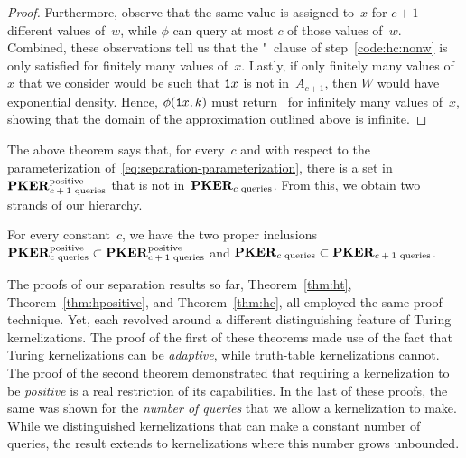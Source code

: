 \begin{proof}
  Furthermore, observe that the same value is assigned to~$x$ for $c + 1$ different values of~$w$, while $\phi$ can query at most $c$ of those values of~$w$.
  Combined, these observations tell us that the "~clause of step~\ref{code:hc:nonw} is only satisfied for finitely many values of~$x$.
  Lastly, if only finitely many values of~$x$ that we consider would be such that $\textnormal{\texttt{1}}x$ is not in~$A_{c + 1}$, then $W$ would have exponential density.
  Hence, $\phi(\textnormal{\texttt{1}}x, k)$ must return~ for infinitely many values of~$x$, showing that the domain of the approximation outlined above is infinite.
\end{proof}

The above theorem says that, for every~$c$ and with respect to the parameterization of~\eqref{eq:separation-parameterization}, there is a set in $\textnormal{\textbf{PKER}}^\textnormal{positive}_\textnormal{$c + 1$ queries}$ that is not in~$\textnormal{\textbf{PKER}}_\textnormal{$c$ queries}$.
From this, we obtain two strands of our hierarchy.
\begin{corollary}
\label{cor:hc}%
  For every constant~$c$, we have the two proper inclusions $\textnormal{\textbf{PKER}}^\textnormal{positive}_\textnormal{$c$ queries} \subset \textnormal{\textbf{PKER}}^\textnormal{positive}_\textnormal{$c + 1$ queries}$ and $\textnormal{\textbf{PKER}}_\textnormal{$c$ queries} \subset \textnormal{\textbf{PKER}}_\textnormal{$c + 1$ queries}$.
\end{corollary}

The proofs of our separation results so far, Theorem~\ref{thm:ht}, Theorem~\ref{thm:hpositive}, and Theorem~\ref{thm:hc}, all employed the same proof technique.
Yet, each revolved around a different distinguishing feature of Turing kernelizations.
The proof of the first of these theorems made use of the fact that Turing kernelizations can be \emph{adaptive}, while truth-table kernelizations cannot.
The proof of the second theorem demonstrated that requiring a kernelization to be \emph{positive} is a real restriction of its capabilities.
In the last of these proofs, the same was shown for the \emph{number of queries} that we allow a kernelization to make.
While we distinguished kernelizations that can make a constant number of queries, the result extends to kernelizations where this number grows unbounded.

